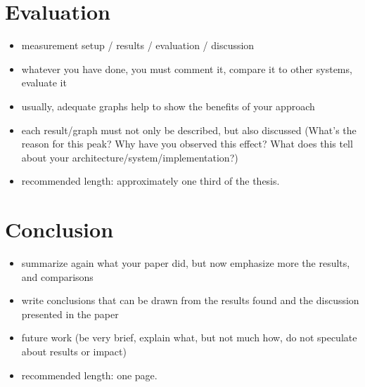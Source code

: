 \chapter{Evaluation}


\begin{itemize}
\item measurement setup / results / evaluation / discussion
\item whatever you have done, you must comment it, compare it to other systems, evaluate it
\item usually, adequate graphs help to show the benefits of your approach
\item each result/graph must not only be described, but also discussed (What's the reason for this peak? Why have you observed this effect? What does this tell about your architecture/system/implementation?)
\item recommended length: approximately one third of the thesis.
\end{itemize}



\chapter{Conclusion}


\begin{itemize}
\item summarize again what your paper did, but now emphasize more the results, and comparisons
\item write conclusions that can be drawn from the results found and the discussion presented in the paper
\item future work (be very brief, explain what, but not much how, do not speculate about results or impact)
\item recommended length: one page.
\end{itemize}



\cleardoublepage

\listofabbreviations
\clearpage

\listoffigures
\clearpage

\listoftables
\clearpage

\printbibliography